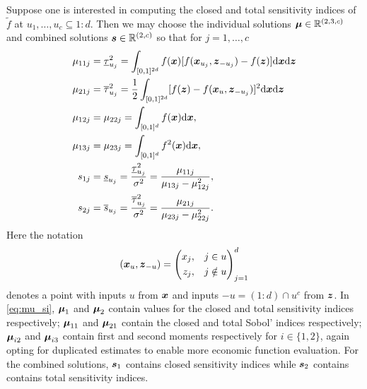 \documentclass{article}[12pt]
\begin{document}
Suppose one is interested in computing the closed and total sensitivity indices of $\tilde{f}$ at $u_1,\dots,u_c \subseteq 1:d$.  Then we may choose the individual solutions $\boldsymbol{\mu} \in \mathbb{R}^{(2, 3, c)}$ and combined solutions $\boldsymbol{s} \in \mathbb{R}^{(2, c)}$ so that for $j=1,\dots,c$
\begin{equation}
\begin{aligned}
    \mu_{11j} &= \underline{\tau}_{u_j}^2 = \int_{[0,1]^{2d}} f(\boldsymbol{x})[f(\boldsymbol{x}_{u_j},\boldsymbol{z}_{-{u_j}})-f(\boldsymbol{z})]\mathrm{d}\boldsymbol{x}\mathrm{d}\boldsymbol{z} \\
    \mu_{21j} &= \overline{\tau}_{u_j}^2 = \frac{1}{2}\int_{[0,1]^{2d}} [f(\boldsymbol{z})-f(\boldsymbol{x}_u,\boldsymbol{z}_{-{u_j}})]^2\mathrm{d}\boldsymbol{x}\mathrm{d}\boldsymbol{z} \\
    \mu_{12j} &= \mu_{22j} = \int_{[0,1]^{d}} f(\boldsymbol{x})\mathrm{d}\boldsymbol{x}, \\
    \mu_{13j} &= \mu_{23j} = \int_{[0,1]^{d}} f^2(\boldsymbol{x})\mathrm{d}\boldsymbol{x}, \\
    s_{1j} &= \underline{s}_{u_j} = \frac{\underline{\tau}_{u_j}^2}{\sigma^2} = \frac{\mu_{11j}}{\mu_{13j}-\mu_{12j}^2}, \\
    s_{2j} &= \overline{s}_{u_j} = \frac{\overline{\tau}_{u_j}^2}{\sigma^2} = \frac{\mu_{21j}}{\mu_{23j}-\mu_{22j}^2}.  
\end{aligned}
\label{eq:mu_si}
\end{equation}
Here the notation
\begin{equation*}
    (\boldsymbol{x}_{u},\boldsymbol{z}_{-u}) = \left(\begin{aligned}x_{j}, \quad & j \in u \\ z_{j}, \quad & j \notin u \end{aligned}\right)_{j=1}^{d}
\end{equation*}
denotes a point with inputs $u$ from $\boldsymbol{x}$ and inputs $-u=(1:d)\cap u^c$ from $\boldsymbol{z}$. In \eqref{eq:mu_si}, $\boldsymbol{\mu}_1$ and $\boldsymbol{\mu}_2$ contain values for the closed and  total sensitivity indices respectively; $\boldsymbol{\mu}_{11}$ and $\boldsymbol{\mu}_{21}$ contain the closed and total Sobol' indices respectively; $\boldsymbol{\mu}_{i2}$ and $\boldsymbol{\mu}_{i3}$ contain first and second moments respectively for $i \in \{1,2\}$, again opting for duplicated estimates to enable more economic function evaluation. For the combined solutions, $\boldsymbol{s}_1$ contains closed sensitivity indices while $\boldsymbol{s}_2$ contains contains total sensitivity indices. 
\end{document}

